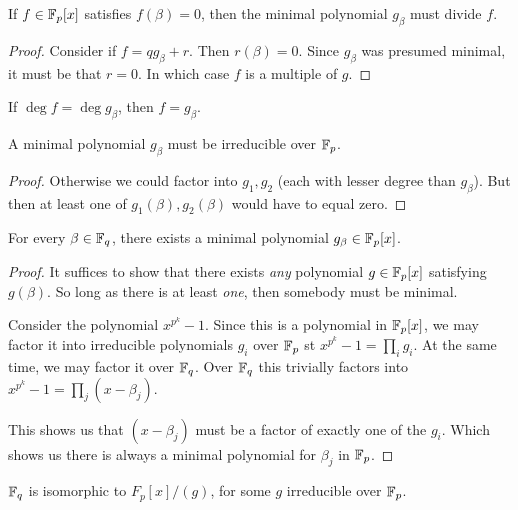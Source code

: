 \begin{proposition}
  If $f \in \mathbb{F}_p[x]$ satisfies $f(\beta) = 0$, then the minimal
  polynomial $g_\beta$ must divide $f$.
\end{proposition}

\begin{proof}
  Consider if $f = qg_\beta + r$. Then $r(\beta) = 0$. Since $g_\beta$
  was presumed minimal, it must be that $r = 0$. In which case $f$ is a
  multiple of $g$.
\end{proof}

\begin{corollary}
  If $\deg f = \deg g_\beta$, then $f = g_\beta$.
\end{corollary}

\begin{proposition}
  A minimal polynomial $g_\beta$ must be irreducible over $\mathbb{F}_p$.
\end{proposition}

\begin{proof}
  Otherwise we could factor into $g_1, g_2$ (each with lesser degree
  than $g_\beta$). But then at least one of $g_1(\beta), g_2(\beta)$
  would have to equal zero.
\end{proof}

\begin{proposition}
  For every $\beta \in \mathbb{F}_q$, there exists a minimal polynomial $g_\beta
  \in \mathbb{F}_p[x]$.
\end{proposition}

\begin{proof}
  It suffices to show that there exists \emph{any} polynomial $g \in
  \mathbb{F}_p[x]$ satisfying $g(\beta)$. So long as there is at least
  \emph{one}, then somebody must be minimal.

  Consider the polynomial $x^{p^k} - 1$. Since this is a polynomial in
  $\mathbb{F}_p[x]$, we may factor it into irreducible polynomials $g_i$ over
  $\mathbb{F}_p$ st $x^{p^k} - 1 = \prod_i g_i$. At the same time, we may factor
  it over $\mathbb{F}_q$. Over $\mathbb{F}_q$ this trivially factors into $x^{p^k} - 1 =
  \prod_j (x - \beta_j)$.

  This shows us that $(x - \beta_j)$ must be a factor of exactly one of
  the $g_i$. Which shows us there is always a minimal polynomial for
  $\beta_j$ in $\mathbb{F}_p$.
\end{proof}

\begin{theorem}
  $\mathbb{F}_q$ is isomorphic to $F_p[x]/(g)$, for some $g$ irreducible over
  $\mathbb{F}_p$.
\end{theorem}

